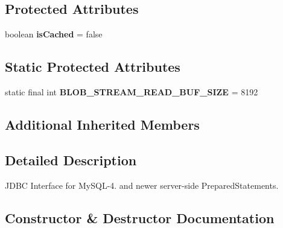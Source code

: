 \subsection*{Protected Attributes}
\begin{DoxyCompactItemize}
\item 
\mbox{\label{classcom_1_1mysql_1_1jdbc_1_1_server_prepared_statement_acf4d1074d0cd65202abd77ff968093d8}} 
boolean {\bfseries is\+Cached} = false
\end{DoxyCompactItemize}
\subsection*{Static Protected Attributes}
\begin{DoxyCompactItemize}
\item 
\mbox{\label{classcom_1_1mysql_1_1jdbc_1_1_server_prepared_statement_ac2cd015ec61d13d1244a00475970ceb7}} 
static final int {\bfseries B\+L\+O\+B\+\_\+\+S\+T\+R\+E\+A\+M\+\_\+\+R\+E\+A\+D\+\_\+\+B\+U\+F\+\_\+\+S\+I\+ZE} = 8192
\end{DoxyCompactItemize}
\subsection*{Additional Inherited Members}


\subsection{Detailed Description}
J\+D\+BC Interface for My\+S\+Q\+L-\/4. and newer server-\/side Prepared\+Statements. 

\subsection{Constructor \& Destructor Documentation}
\mbox{\label{classcom_1_1mysql_1_1jdbc_1_1_server_prepared_statement_a18c9d09a55d3c02fda15e64e5c818c8f}} 
